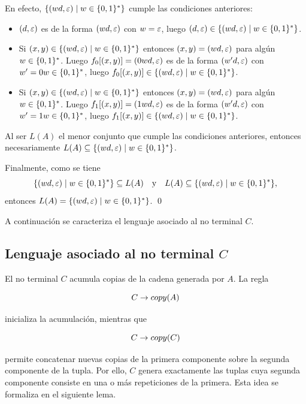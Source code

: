 En efecto, $\{ (w d, \varepsilon) \;|\; w \in \{0, 1\}^* \}$ cumple las condiciones anteriores:
\begin{itemize}
    \item $(d, \varepsilon)$ es de la forma $(w d, \varepsilon)$ con $w = \varepsilon$, luego $(d, \varepsilon) \in \{ (w d, \varepsilon) \;|\; w \in \{0, 1\}^* \}$.
    \item Si $(x, y) \in \{ (w d, \varepsilon) \;|\; w \in \{0, 1\}^* \}$ entonces $(x, y) = (w d, \varepsilon)$ para algún $w \in \{0, 1\}^*$. Luego $f_0[(x, y)] = (0w d, \varepsilon)$ es de la forma $(w' d, \varepsilon)$ con $w' = 0w \in \{0, 1\}^*$, luego $f_0[(x, y)] \in \{ (w d, \varepsilon) \;|\; w \in \{0, 1\}^* \}$.
    \item Si $(x, y) \in \{ (w d, \varepsilon) \;|\; w \in \{0, 1\}^* \}$ entonces $(x, y) = (w d, \varepsilon)$ para algún $w \in \{0, 1\}^*$. Luego $f_1[(x, y)] = (1w d, \varepsilon)$ es de la forma $(w' d, \varepsilon)$ con $w' = 1w \in \{0, 1\}^*$, luego $f_1[(x, y)] \in \{ (w d, \varepsilon) \;|\; w \in \{0, 1\}^* \}$.
\end{itemize}

Al ser $L(A)$ el menor conjunto que cumple las condiciones anteriores, entonces necesariamente $L(A) \subseteq \{ (w d, \varepsilon) \;|\; w \in \{0, 1\}^* \}$.

Finalmente, como se tiene
$$\{ (w d, \varepsilon) \;|\; w \in \{0, 1\}^* \} \subseteq L(A) \quad \text{y} \quad L(A) \subseteq \{ (w d, \varepsilon) \;|\; w \in \{0, 1\}^* \},$$
entonces $L(A) = \{ (w d, \varepsilon) \;|\; w \in \{0, 1\}^* \}$. \qed

A continuación se caracteriza el lenguaje asociado al no terminal $C$.

\subsection*{Lenguaje asociado al no terminal $C$}

El no terminal $C$ acumula copias de la cadena generada por $A$. La regla

$$
    C \rightarrow copy(A)
$$

inicializa la acumulación, mientras que

$$
    C \rightarrow copy(C)
$$

permite concatenar nuevas copias de la primera componente sobre la segunda componente de la tupla. Por ello, $C$ genera exactamente las tuplas cuya segunda componente consiste en una o más repeticiones de la primera. Esta idea se formaliza en el siguiente lema.

